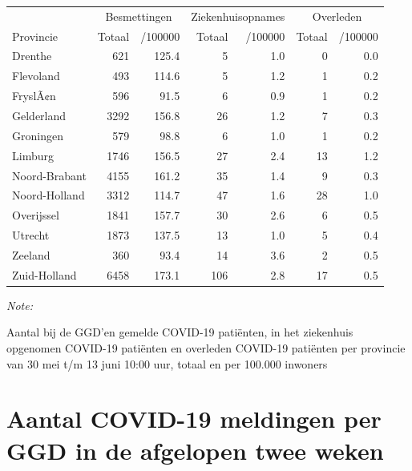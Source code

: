 \documentclass[
  english,
  man,floatsintext]{apa6}
\begin{document}
\begin{table}
\centering
\begin{threeparttable}
\begin{tabular}{lrrrrrr}
\toprule
\multicolumn{1}{c}{ } & \multicolumn{2}{c}{Besmettingen} & \multicolumn{2}{c}{Ziekenhuisopnames} & \multicolumn{2}{c}{Overleden} \\
\cmidrule(l{3pt}r{3pt}){2-3} \cmidrule(l{3pt}r{3pt}){4-5} \cmidrule(l{3pt}r{3pt}){6-7}
Provincie & Totaal & /100000 & Totaal & /100000 & Totaal & /100000\\
\midrule
Drenthe & 621 & 125.4 & 5 & 1.0 & 0 & 0.0\\
Flevoland & 493 & 114.6 & 5 & 1.2 & 1 & 0.2\\
FryslÃ¢n & 596 & 91.5 & 6 & 0.9 & 1 & 0.2\\
Gelderland & 3292 & 156.8 & 26 & 1.2 & 7 & 0.3\\
Groningen & 579 & 98.8 & 6 & 1.0 & 1 & 0.2\\
Limburg & 1746 & 156.5 & 27 & 2.4 & 13 & 1.2\\
Noord-Brabant & 4155 & 161.2 & 35 & 1.4 & 9 & 0.3\\
Noord-Holland & 3312 & 114.7 & 47 & 1.6 & 28 & 1.0\\
Overijssel & 1841 & 157.7 & 30 & 2.6 & 6 & 0.5\\
Utrecht & 1873 & 137.5 & 13 & 1.0 & 5 & 0.4\\
Zeeland & 360 & 93.4 & 14 & 3.6 & 2 & 0.5\\
Zuid-Holland & 6458 & 173.1 & 106 & 2.8 & 17 & 0.5\\
\bottomrule
\end{tabular}
\begin{tablenotes}
\item \textit{Note: } 
\item Aantal bij de GGD’en gemelde COVID-19 patiënten, in het ziekenhuis opgenomen COVID-19 patiënten en overleden COVID-19 patiënten per provincie van 30 mei t/m 13 juni 10:00 uur, totaal en per 100.000 inwoners
\end{tablenotes}
\end{threeparttable}
\end{table}

\newpage

\hypertarget{aantal-covid-19-meldingen-per-ggd-in-de-afgelopen-twee-weken}{%
\section{Aantal COVID-19 meldingen per GGD in de afgelopen twee weken}\label{aantal-covid-19-meldingen-per-ggd-in-de-afgelopen-twee-weken}}
\end{document}
